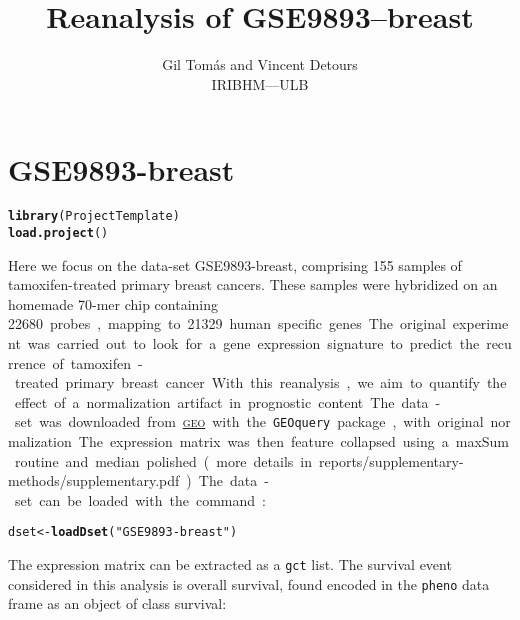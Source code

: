 \documentclass{article}\usepackage[]{graphicx}\usepackage[]{color}
\title{Reanalysis of GSE9893--breast}
\author{Gil Tom\'{a}s and Vincent Detours\\
  \textsc{IRIBHM---ULB}}
\makeatletter
\newcommand{\hlstr}[1]{\textcolor[rgb]{0.192,0.494,0.8}{#1}}%
\newcommand{\hlstd}[1]{\textcolor[rgb]{0.345,0.345,0.345}{#1}}%
\newcommand{\hlkwb}[1]{\textcolor[rgb]{0.69,0.353,0.396}{#1}}%
\newcommand{\hlkwd}[1]{\textcolor[rgb]{0.737,0.353,0.396}{\textbf{#1}}}%
\newenvironment{kframe}{%
 \def\at@end@of@kframe{}%
 \ifinner\ifhmode%
  \def\at@end@of@kframe{\end{minipage}}%
  \begin{minipage}{\columnwidth}%
 \fi\fi%
 \def\FrameCommand##1{\hskip\@totalleftmargin \hskip-\fboxsep
 \colorbox{shadecolor}{##1}\hskip-\fboxsep
     \hskip-\linewidth \hskip-\@totalleftmargin \hskip\columnwidth}%
 \MakeFramed {\advance\hsize-\width
   \@totalleftmargin\z@ \linewidth\hsize
   \@setminipage}}%
 {\par\unskip\endMakeFramed%
 \at@end@of@kframe}
\newenvironment{knitrout}{}{} %
\makeatother
\begin{document}
\maketitle
\tableofcontents



\section{GSE9893-breast}

\begin{knitrout}\small
{}\color{fgcolor}\begin{kframe}
\begin{alltt}
\hlkwd{library} \hlstd{(ProjectTemplate)}
\hlkwd{load.project} \hlstd{()}
\end{alltt}
\end{kframe}
\end{knitrout}

Here we focus on the data-set \textsf{GSE9893-breast}, comprising 155 samples of
tamoxifen-treated primary breast cancers.  These samples were hybridized on an
homemade \mbox{70-mer} chip containing \SI{22680} probes, mapping to \SI{21329}
human specific genes.  The original experiment was carried out to look for a
gene expression signature to predict the recurrence of tamoxifen-treated primary
breast cancer.

With this reanalysis, we aim to quantify the effect of a normalization artifact
in prognostic content.  The data-set was downloaded from
\href{http://www.ncbi.nlm.nih.gov/geo/query/acc.cgi?acc=GSE9893}{\textsc{geo}}
with the \texttt{GEOquery} package, with original normalization.  The expression
matrix was then feature collapsed using a maxSum routine and median polished
(more details in \textsf{reports/supplementary-methods/supplementary.pdf}).

The data-set can be loaded with the command:

\begin{knitrout}\small
{}\color{fgcolor}\begin{kframe}
\begin{alltt}
\hlstd{dset} \hlkwb{<-} \hlkwd{loadDset} \hlstd{(}\hlstr{"GSE9893-breast"}\hlstd{)}
\end{alltt}
\end{kframe}
\end{knitrout}

The expression matrix can be extracted as a \texttt{gct} list.  The survival
event considered in this analysis is overall survival, found encoded in the
\texttt{pheno} data frame as an object of class survival:
\end{document}
